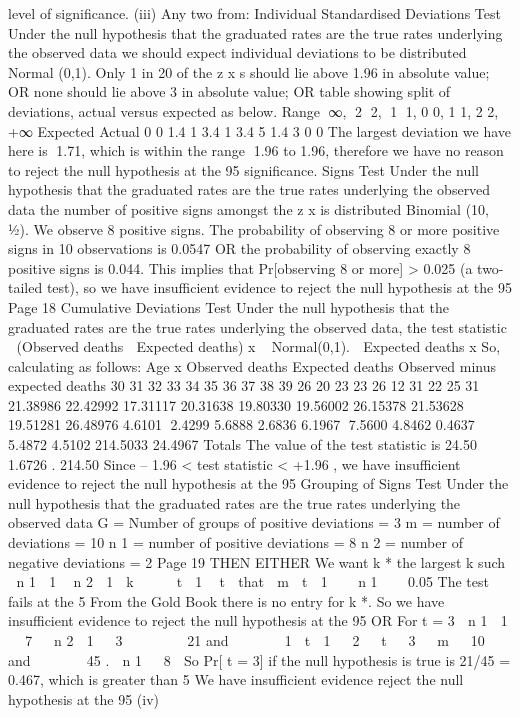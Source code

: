 \documentclass[a4paper,12pt]{article}
\begin{document}
\begin{enumerate}
level of significance.
(iii)
Any two from:
Individual Standardised Deviations Test
Under the null hypothesis that the graduated rates are the true rates underlying the
observed data
we should expect individual deviations to be distributed Normal (0,1).
Only 1 in 20 of the z x s should lie above 1.96 in absolute value;
OR
none should lie above 3 in absolute value;
OR
table showing split of deviations, actual versus expected as below.
Range ∞, 2 2, 1 1, 0 0, 1 1, 2 2, +∞
Expected
Actual 0
0 1.4
1 3.4
1 3.4
5 1.4
3 0
0
The largest deviation we have here is 1.71,
which is within the range 1.96 to 1.96,
therefore we have no reason to reject the null hypothesis at the 95%
significance.
Signs Test
Under the null hypothesis that the graduated rates are the true rates underlying the
observed data
the number of positive signs amongst the z x is distributed
Binomial (10, 1⁄2).
We observe 8 positive signs.
The probability of observing 8 or more positive signs in 10 observations is 0.0547
OR the probability of observing exactly 8 positive signs is 0.044.
This implies that Pr[observing 8 or more] > 0.025 (a two-tailed test),
so we have insufficient evidence to reject the null hypothesis at the 95%
Page 18%
Cumulative Deviations Test
Under the null hypothesis that the graduated rates are the true rates underlying the
observed data, the test statistic
 (Observed deaths  Expected deaths)
x
~ Normal(0,1).
 Expected deaths
x
So, calculating as follows:
Age x Observed deaths Expected deaths Observed minus
expected deaths
30
31
32
33
34
35
36
37
38
39 26
20
23
23
26
12
31
22
25
31 21.38986
22.42992
17.31117
20.31638
19.80330
19.56002
26.15378
21.53628
19.51281
26.48976 4.6101
2.4299
5.6888
2.6836
6.1967
7.5600
4.8462
0.4637
5.4872
4.5102
214.5033 24.4967
Totals
The value of the test statistic is
24.50
 1.6726 .
214.50
Since – 1.96 < test statistic < +1.96 ,
we have insufficient evidence to reject the null hypothesis at the 95%
Grouping of Signs Test
Under the null hypothesis that the graduated rates are the true rates underlying the
observed data
G = Number of groups of positive deviations = 3
m = number of deviations = 10
n 1 = number of positive deviations = 8
n 2 = number of negative deviations = 2
Page 19%
THEN EITHER
We want k * the largest k such
 n 1  1  n 2  1 
k 


 t  1  t 
that
 m 
t  1
 
 n 1 

 0.05
The test fails at the 5%
From the Gold Book there is no entry for k *.
So we have insufficient evidence to reject the null hypothesis at the 95%
OR
For t = 3
 n 1  1   7 
 n 2  1   3 

     21 and 
     1
 t  1   2 
 t   3 
 m   10 
and       45 .
 n 1   8 
So Pr[ t = 3] if the null hypothesis is true is 21/45 = 0.467, which is greater than 5%
We have insufficient evidence reject the null hypothesis at the 95%
(iv)


\end{enumerate}
\end{document}
